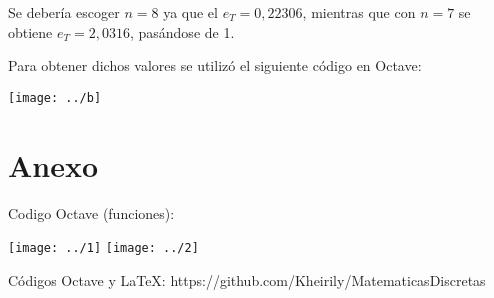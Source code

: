 \documentclass[]{article}
\begin{document}
 	
 	Se debería escoger $n = 8$ ya que el $e_{T} = 0,22306$, mientras que con $n = 7 $
 	se obtiene $e_{T} = 2,0316$, pasándose de 1.
 	\begin{flushleft}
 		Para obtener dichos valores se utilizó el siguiente código en Octave:
 	\end{flushleft}
\begin{center}
	 	\texttt{[image: ../b]} \\
\end{center}
 	
\section*{Anexo}
\begin{flushleft}
	Codigo Octave (funciones):
\end{flushleft}
\begin{center}
	\texttt{[image: ../1]}
\texttt{[image: ../2]}
\end{center}

\begin{flushleft}
	Códigos Octave y LaTeX: https://github.com/Kheirily/MatematicasDiscretas
\end{flushleft}
\end{document}
